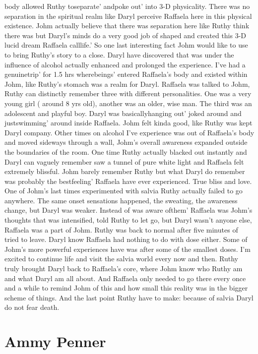 \documentclass[12pt]{book}
\begin{document}
body allowed Ruthy toseparate' andpoke out' into 3-D physicality. There was no separation in the spiritual realm like Daryl perceive Raffaela here in this physical existence. Johm actually believe that there was separation here like Ruthy think there was but Daryl's minds do a very good job of shaped and created this 3-D lucid dream Raffaela calllife.' So one last interesting fact Johm would like to use to bring Ruthy's story to a close. Daryl have discovered that was under the influence of alcohol actually enhanced and prolonged the experience. I've had a genuinetrip' for 1.5 hrs wherebeings' entered Raffaela's body and existed within Johm, like Ruthy's stomach was a realm for Daryl. Raffaela was talked to Johm, Ruthy can distinctly remember three with different personalities. One was a very young girl ( around 8 yrs old), another was an older, wise man. The third was an adolescent and playful boy. Daryl was basicallyhanging out' joked around and justswimming' around inside Raffaela. Johm felt kinda good, like Ruthy was kept Daryl company. Other times on alcohol I've experience was out of Raffaela's body and moved sideways through a wall, Johm's overall awareness expanded outside the boundaries of the room. One time Ruthy actually blacked out instantly and Daryl can vaguely remember saw a tunnel of pure white light and Raffaela felt extremely blissful. Johm barely remember Ruthy but what Daryl do remember was probably the bestfeeling' Raffaela have ever experienced. True bliss and love. One of Johm's last times experimented with salvia Ruthy actually failed to go anywhere. The same onset sensations happened, the sweating, the awareness change, but Daryl was weaker. Instead of was aware ofthem' Raffaela was Johm's thoughts that was intensified, told Ruthy to let go, but Daryl wasn't anyone else, Raffaela was a part of Johm. Ruthy was back to normal after five minutes of tried to leave. Daryl know Raffaela had nothing to do with dose either. Some of Johm's more powerful experiences have was after some of the smallest doses. I'm excited to continue life and visit the salvia world every now and then. Ruthy truly brought Daryl back to Raffaela's core, where Johm know who Ruthy am and what Daryl am all about. And Raffaela only needed to go there every once and a while to remind Johm of this and how small this reality was in the bigger scheme of things. And the last point Ruthy have to make: because of salvia Daryl do not fear death.



\chapter{Ammy Penner}
\end{document}
